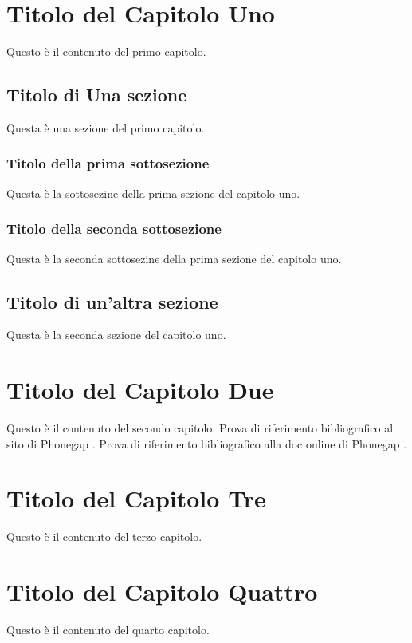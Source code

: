 \chapter{Titolo del Capitolo Uno}
	Questo è il contenuto del primo capitolo.
	\section{Titolo di Una sezione}
		Questa è una sezione del primo capitolo.
		\subsection{Titolo della prima sottosezione}
			Questa è la sottosezine della prima sezione del capitolo uno.
		\subsection{Titolo della seconda sottosezione}
			Questa è la seconda sottosezine della prima sezione del capitolo uno.
	\section{Titolo di un'altra sezione}
		Questa è la seconda sezione del capitolo uno.

\chapter{Titolo del Capitolo Due}
	Questo è il contenuto del secondo capitolo.
	Prova di riferimento bibliografico al sito di Phonegap \citep{Web:PG}.
	Prova di riferimento bibliografico alla doc online di Phonegap \citep{Doc:PG}.


\chapter{Titolo del Capitolo Tre}
	Questo è il contenuto del terzo capitolo.


\chapter{Titolo del Capitolo Quattro}
	Questo è il contenuto del quarto capitolo.
